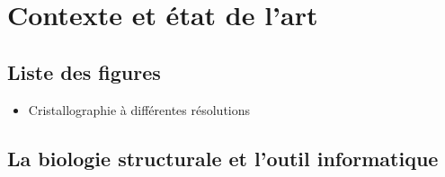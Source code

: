 \chapter[La biologie structurale au sein d'environnements immersifs et interactifs]{Contexte et état de l'art}
\minitoc
\cleardoublepage

\section{Liste des figures}

\begin{itemize}
	\item Cristallographie à différentes résolutions
\end{itemize}

\section{La biologie structurale et l'outil informatique}

